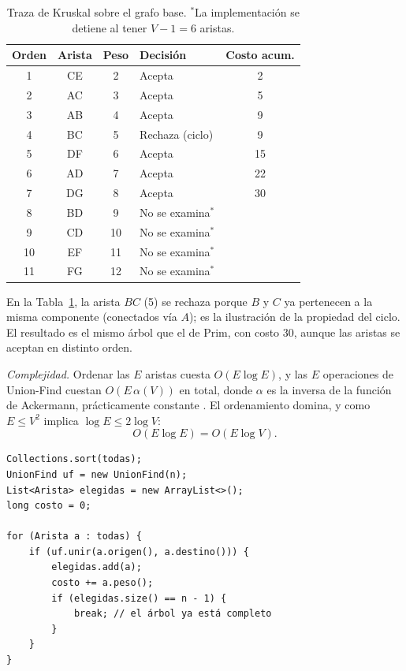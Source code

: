 \documentclass[conference]{IEEEtran}
\begin{document}
\begin{table}[t]
\caption{Traza de Kruskal sobre el grafo base. $^{*}$La implementación se detiene al tener $V-1=6$ aristas.}
\label{tab:kruskal}
\centering
\footnotesize
\setlength{\tabcolsep}{3pt}
\begin{tabular}{@{}cccp{2.3cm}c@{}}
\toprule
Orden & Arista & Peso & Decisión & Costo acum. \\
\midrule
1 & CE & 2 & Acepta & 2 \\
2 & AC & 3 & Acepta & 5 \\
3 & AB & 4 & Acepta & 9 \\
4 & BC & 5 & Rechaza (ciclo) & 9 \\
5 & DF & 6 & Acepta & 15 \\
6 & AD & 7 & Acepta & 22 \\
7 & DG & 8 & Acepta & 30 \\
8 & BD & 9 & No se examina$^{*}$ &  \\
9 & CD & 10 & No se examina$^{*}$ &  \\
10 & EF & 11 & No se examina$^{*}$ &  \\
11 & FG & 12 & No se examina$^{*}$ &  \\
\bottomrule
\end{tabular}
\end{table}

En la Tabla~\ref{tab:kruskal}, la arista $BC$ (5) se rechaza porque $B$ y $C$ ya pertenecen a la misma componente (conectados vía $A$); es la ilustración de la propiedad del ciclo. El resultado es el mismo árbol que el de Prim, con costo 30, aunque las aristas se aceptan en distinto orden.

\emph{Complejidad.} Ordenar las $E$ aristas cuesta $O(E\log E)$, y las $E$ operaciones de Union-Find cuestan $O(E\,\alpha(V))$ en total, donde $\alpha$ es la inversa de la función de Ackermann, prácticamente constante \cite{tarjan75}. El ordenamiento domina, y como $E\le V^2$ implica $\log E\le 2\log V$:
\begin{equation}
O(E\log E)=O(E\log V).
\end{equation}

\noindent\begin{minipage}{\columnwidth}
\begin{lstlisting}[caption={Núcleo de Kruskal (\texttt{Kruskal.java}).},label={lst:kruskal}]
Collections.sort(todas);
UnionFind uf = new UnionFind(n);
List<Arista> elegidas = new ArrayList<>();
long costo = 0;

for (Arista a : todas) {
    if (uf.unir(a.origen(), a.destino())) {
        elegidas.add(a);
        costo += a.peso();
        if (elegidas.size() == n - 1) {
            break; // el árbol ya está completo
        }
    }
}
\end{lstlisting}
\end{minipage}\par\medskip
\end{document}
